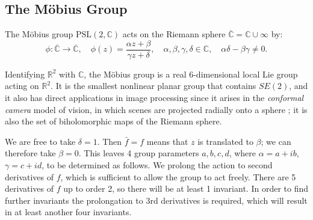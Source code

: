 \documentclass[review,onefignum,onetabnum]{siamonline190516}
\def\R{\mathbb{R}}
\begin{document}
{\subsection{The M\"{o}bius Group}

The M\"obius group $\mathrm{PSL}(2,\mathbb{C})$ acts on the Riemann sphere
$\overline{\mathbb{C}} = \mathbb{C}\cup\infty$ by:
\begin{equation} 
\phi\colon \overline{\mathbb{C}} \to \overline{\mathbb{C}},\quad \phi(z) = \frac{\alpha z + \beta}{\gamma z + \delta},\quad \alpha,\beta,\gamma,\delta\in\mathbb{C}, \quad
\alpha\delta-\beta\gamma\ne 0.
\end{equation}

Identifying $\R^2$ with $\mathbb{C}$, the M\"obius group is a real 6-dimensional local Lie group acting on $\mathbb{R}^2$.
It is the smallest nonlinear planar group that contains $SE(2)$, and it also has direct applications in image processing since it arises in the {\em conformal camera} model of vision, in which scenes are projected radially onto a sphere \cite{lenz1990group,turski2004geometric}; it is also the set of biholomorphic maps of the Riemann sphere. 

We are free to take $\delta=1$. Then $\bar f = f$ means that $z$ is translated to $\beta$; we can therefore take $\beta=0$. This leaves 4 group parameters $a,b,c,d$, where $\alpha = a + i b$, $\gamma = c + i d$, to be determined as follows. We prolong the action to second derivatives of $f$, which is sufficient to allow the group to act freely. There are 5 derivatives of $f$ up to order 2, so there will be at least 1 invariant. In order to find further invariants the prolongation to 3rd derivatives is required, which will result in at least another four invariants. %

}
\end{document}
